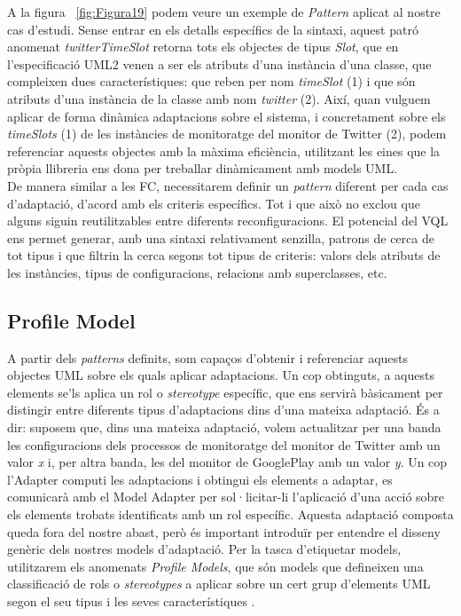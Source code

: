 A la figura ~\ref{fig:Figura19} podem veure un exemple de \textit{Pattern} aplicat al nostre cas d'estudi. Sense entrar en els detalls específics de la sintaxi, aquest patró anomenat \textit{twitterTimeSlot} retorna tots els objectes de tipus \textit{Slot}, que en l'especificació UML2 venen a ser els atributs d'una instància d'una classe, que compleixen dues característiques: que reben per nom \textit{timeSlot} (1) i que són atributs d'una instància de la classe amb nom \textit{twitter} (2). Així, quan vulguem aplicar de forma dinàmica adaptacions sobre el sistema, i concretament sobre els \textit{timeSlots} (1) de les instàncies de monitoratge del monitor de Twitter (2), podem referenciar aquests objectes amb la màxima eficiència, utilitzant les eines que la pròpia llibreria ens dona per treballar dinàmicament amb models UML.\\

De manera similar a les FC, necessitarem definir un \textit{pattern} diferent per cada cas d'adaptació, d'acord amb els criteris específics. Tot i que això no exclou que alguns siguin reutilitzables entre diferents reconfiguracions. El potencial del VQL ens permet generar, amb una sintaxi relativament senzilla, patrons de cerca de tot tipus i que filtrin la cerca segons tot tipus de criteris: valors dels atributs de les instàncies, tipus de configuracions, relacions amb superclasses, etc. 
 
\subsection{Profile Model}

A partir dels \textit{patterns} definits, som capaços d'obtenir i referenciar aquests objectes UML sobre els quals aplicar adaptacions. Un cop obtinguts, a aquests elements se'ls aplica un rol o \textit{stereotype} específic, que ens servirà bàsicament per distingir entre diferents tipus d'adaptacions dins d'una mateixa adaptació. És a dir: suposem que, dins una mateixa adaptació, volem actualitzar per una banda les configuracions dels processos de monitoratge del monitor de Twitter amb un valor \textit{x} i, per altra banda, les del monitor de GooglePlay amb un valor \textit{y}. Un cop l'Adapter computi les adaptacions i obtingui els elements a adaptar, es comunicarà amb el Model Adapter per sol·licitar-li l'aplicació d'una acció sobre els elements trobats identificats amb un rol específic. Aquesta adaptació composta queda fora del nostre abast, però és important introduïr per entendre el disseny genèric dels nostres models d'adaptació. Per la tasca d'etiquetar models, utilitzarem els anomenats \textit{Profile Models}, que són models que defineixen una classificació de rols o \textit{stereotypes} a aplicar sobre un cert grup d'elements UML segon el seu tipus i les seves característiques \cite{profile}.\\

